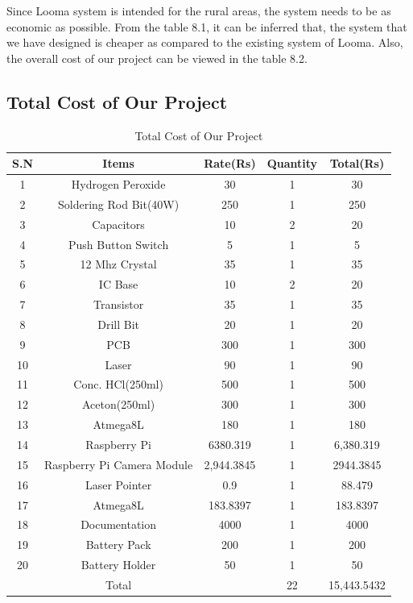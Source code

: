 \documentclass[12pt, a4paper]{article}
\begin{document}
Since Looma system is intended for the rural areas, the system needs to be as economic as possible. From the table 8.1, it can be inferred that, the system that we have designed is cheaper as compared to the existing system of Looma. Also, the overall cost of our project can be viewed in the table 8.2.
\clearpage
\subsection{Total Cost of Our Project}
\begin{table}[ht]
\begin{tabular}{|c|c|c|c|c|}
\hline
	S.N & Items & Rate(Rs) & Quantity & Total(Rs) \\
\hline
	1 & Hydrogen Peroxide & 30 & 1 & 30 \\
\hline
	2 & Soldering Rod Bit(40W) & 250 & 1 & 250 \\
\hline
	3 & Capacitors & 10 & 2 & 20 \\
\hline
	4 & Push Button Switch & 5 & 1 & 5 \\
\hline
	5 & 12 Mhz Crystal & 35 & 1 & 35 \\
\hline
	6 & IC Base & 10 & 2 & 20 \\
\hline
	7 & Transistor & 35 & 1 & 35 \\
\hline
	8 & Drill Bit & 20 & 1 & 20 \\
\hline
	9 & PCB & 300 & 1 & 300 \\
\hline
	10 & Laser & 90 & 1 & 90 \\
\hline
	11 & Conc. HCl(250ml) & 500 & 1 & 500 \\
\hline
	12 & Aceton(250ml) & 300 & 1 & 300 \\
\hline
	13 & Atmega8L & 180 & 1 & 180 \\
\hline
	14 & Raspberry Pi & 6380.319 & 1 & 6,380.319 \\
\hline
	15 & Raspberry Pi Camera Module & 2,944.3845 & 1 & 2944.3845 \\
\hline
	16 & Laser Pointer &  0.9 & 1 & 88.479 \\
\hline 
    17 & Atmega8L & 183.8397 & 1 & 183.8397 \\
\hline
	18 & Documentation &  4000 & 1 & 4000 \\
\hline
	19 & Battery Pack & 200 & 1 & 200 \\
\hline 
    20 & Battery Holder & 50 & 1 & 50 \\
\hline 
	   & Total & & 22 & 15,443.5432\\
\hline	   
\end{tabular}
\caption{Total Cost of Our Project}
\label{tb:sw}
\end{table}
\newpage
\end{document}
